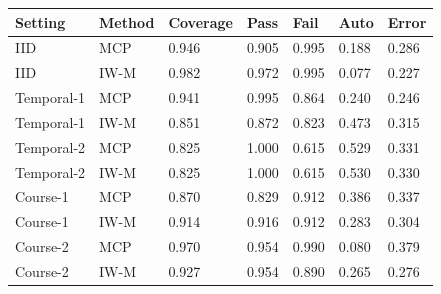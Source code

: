 \begin{tabular}{lllllll}
\toprule
Setting & Method & Coverage & Pass & Fail & Auto & Error\\
\midrule
IID & MCP & 0.946 & 0.905 & 0.995 & 0.188 & 0.286\\
IID & IW-M & 0.982 & 0.972 & 0.995 & 0.077 & 0.227\\
Temporal-1 & MCP & 0.941 & 0.995 & 0.864 & 0.240 & 0.246\\
Temporal-1 & IW-M & 0.851 & 0.872 & 0.823 & 0.473 & 0.315\\
Temporal-2 & MCP & 0.825 & 1.000 & 0.615 & 0.529 & 0.331\\
Temporal-2 & IW-M & 0.825 & 1.000 & 0.615 & 0.530 & 0.330\\
Course-1 & MCP & 0.870 & 0.829 & 0.912 & 0.386 & 0.337\\
Course-1 & IW-M & 0.914 & 0.916 & 0.912 & 0.283 & 0.304\\
Course-2 & MCP & 0.970 & 0.954 & 0.990 & 0.080 & 0.379\\
Course-2 & IW-M & 0.927 & 0.954 & 0.890 & 0.265 & 0.276\\
\bottomrule
\end{tabular}